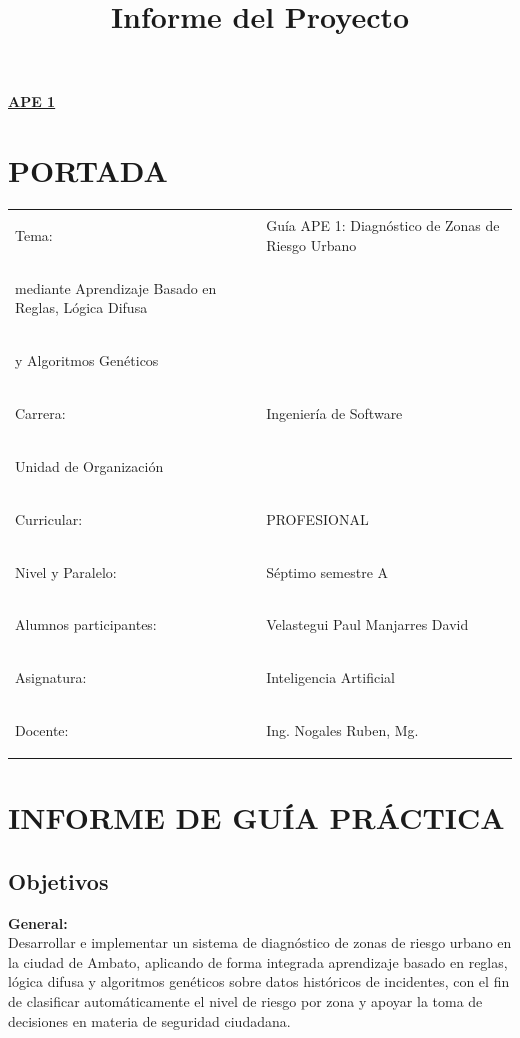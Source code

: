 \documentclass[11pt]{article}
\title{Informe del Proyecto}
\begin{document}
\titleformat{\section}{\normalfont\Large\bfseries}{\thesection}{1em}{}
\renewcommand{\thesection}{\Roman{section}}
\begin{center}
    \textbf{\underline{\normalsize APE 1}}
\end{center}

\section{PORTADA}

\begin{tabularx}{\textwidth}{@{}>{\bfseries\raggedright\arraybackslash}p{4.9cm}>{\raggedright\arraybackslash}X@{}}
Tema: & Guía APE 1: Diagnóstico de Zonas de Riesgo Urbano\\mediante Aprendizaje Basado en Reglas, Lógica Difusa\\y Algoritmos Genéticos \\
Carrera: & Ingeniería de Software \\
Unidad de Organización\\Curricular: & PROFESIONAL \\
Nivel y Paralelo: & Séptimo semestre A \\
Alumnos participantes: & Velastegui Paul \newline Manjarres David \\
Asignatura: & Inteligencia Artificial \\
Docente: & Ing. Nogales Ruben, Mg. \\
\end{tabularx}

\section{INFORME DE GUÍA PRÁCTICA}
\titleformat{\section}{\normalfont\Large\bfseries}{\thesection}{1em}{}
\renewcommand{\thesection}{\arabic{section}}

\subsection{Objetivos}

\textbf{General:}\\
Desarrollar e implementar un sistema de diagnóstico de zonas de riesgo urbano en la ciudad de Ambato, aplicando de forma integrada aprendizaje basado en reglas, lógica difusa y algoritmos genéticos sobre datos históricos de incidentes, con el fin de clasificar automáticamente el nivel de riesgo por zona y apoyar la toma de decisiones en materia de seguridad ciudadana.\\
\end{document}
